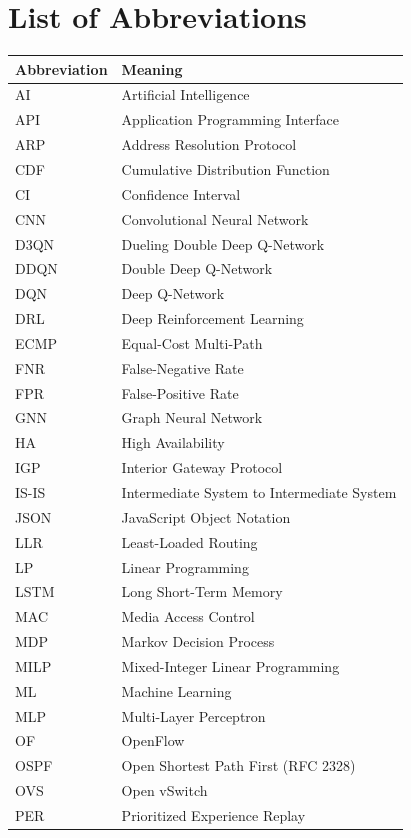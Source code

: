 \documentclass[12pt,a4paper,oneside]{report}
\begin{document}
\chapter*{List of Abbreviations}
\begin{longtable}{p{32mm}p{115mm}}
\toprule
\textbf{Abbreviation} & \textbf{Meaning}\\
\midrule
\endhead
AI & Artificial Intelligence\\
API & Application Programming Interface\\
ARP & Address Resolution Protocol\\
CDF & Cumulative Distribution Function\\
CI & Confidence Interval\\
CNN & Convolutional Neural Network\\
D3QN & Dueling Double Deep Q-Network\\
DDQN & Double Deep Q-Network\\
DQN & Deep Q-Network\\
DRL & Deep Reinforcement Learning\\
ECMP & Equal-Cost Multi-Path\\
FNR & False-Negative Rate\\
FPR & False-Positive Rate\\
GNN & Graph Neural Network\\
HA & High Availability\\
IGP & Interior Gateway Protocol\\
IS-IS & Intermediate System to Intermediate System\\
JSON & JavaScript Object Notation\\
LLR & Least-Loaded Routing\\
LP & Linear Programming\\
LSTM & Long Short-Term Memory\\
MAC & Media Access Control\\
MDP & Markov Decision Process\\
MILP & Mixed-Integer Linear Programming\\
ML & Machine Learning\\
MLP & Multi-Layer Perceptron\\
OF & OpenFlow\\
OSPF & Open Shortest Path First (RFC 2328)\\
OVS & Open vSwitch\\
PER & Prioritized Experience Replay\\

\end{longtable}
\end{document}
